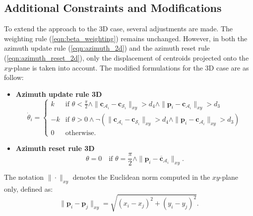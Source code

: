     \subsection{Additional Constraints and Modifications}
        To extend the approach to the \ac{3D} case, several adjustments are made.
        The weighting rule (\ref{eqn:beta_weighting}) remains unchanged. 
        However, in both the azimuth update rule (\ref{eqn:azimuth_2d}) and the azimuth reset rule (\ref{eqn:azimuth_reset_2d}), only the displacement of centroids projected onto the $xy$-plane is taken into account.
        The modified formulations for the \ac{3D} case are as follow:
        \begin{itemize}
            \item \textbf{Azimuth update rule \ac{3D}}
                \begin{equation}
                    \label{eqn:azimuth_3d}
                    \dot{\theta}_i = 
                    \begin{cases}
                        k  & \text{if } \theta < \frac{\pi}{2} \land \|\mathbf{c}_{\mathcal{A}_i} - \mathbf{c}_{\mathcal{S}_i}\|_{xy} > d_4 \land \|\mathbf{p}_i - \mathbf{c}_{\mathcal{A}_i}\|_{xy} > d_3 \\
                        -k & \text{if } \theta > 0 \land \neg (\|\mathbf{c}_{\mathcal{A}_i} - \mathbf{c}_{\mathcal{S}_i}\|_{xy} > d_4 \land \|\mathbf{p}_i - \mathbf{c}_{\mathcal{A}_i}\|_{xy} > d_3) \\
                        0  & \text{otherwise} \text{.}
                    \end{cases}
                \end{equation}
            \item \textbf{Azimuth reset rule \ac{3D}}
                \begin{equation}
                    \label{eqn:azimuth_reset_3d}
                    \theta = 0 \quad \text{if } \theta = \frac{\pi}{2} \land \| \mathbf{p}_i - \mathbf{\overline{c}}_{\mathcal{A}_i} \|_{xy}\text{.}
                \end{equation}
        \end{itemize}

        The notation $\| \cdot \|_{xy}$ denotes the Euclidean norm computed in the $xy$-plane only, defined as:
        \begin{equation}
            \| \mathbf{p}_i - \mathbf{p}_j \|_{xy} = \sqrt{(x_i - x_j)^2 + (y_i - y_j)^2}\text{.}
        \end{equation}

